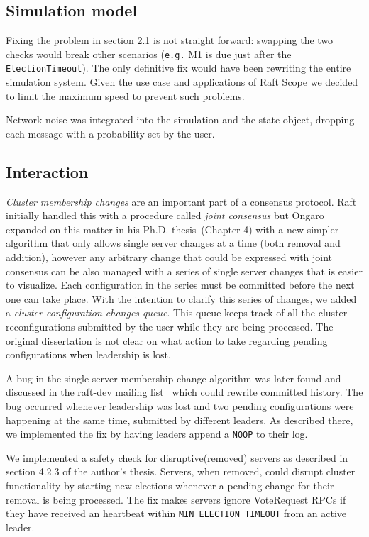\subsection{Simulation model}
Fixing the problem in section 2.1 is not straight forward: swapping the two checks would
break other scenarios (\texttt{e.g.} M1 is due just after the \texttt{ElectionTimeout}).
The only definitive fix would have been rewriting the entire simulation system.
Given the use case and applications of Raft Scope we decided to limit the maximum speed to prevent such problems.

Network noise was integrated into the simulation and the state object, dropping each message with a probability
set by the user.

\subsection{Interaction}
\emph{Cluster membership changes} are an important part of a consensus protocol. Raft initially handled this with a procedure
called \emph{joint consensus} but Ongaro expanded on this matter in his Ph.D. thesis~\cite{ongaro2014consensus}(Chapter 4) with a new
simpler algorithm that only allows single server changes at a time (both removal and addition), however any arbitrary
change that could be expressed with joint consensus can be also managed with a series of single server changes that is easier to visualize.
Each configuration in the series must be committed before the next one can take place.
With the intention to clarify this series of changes, we added a \emph{cluster configuration changes queue}.
This queue keeps track of all the cluster reconfigurations submitted by the user while they are being processed.
The original dissertation is not clear on what action to take regarding pending configurations when leadership is lost.

A bug in the single server membership change algorithm was later found and discussed in the raft-dev mailing list~\cite{bug} which
could rewrite committed history. The bug occurred whenever leadership was lost and two pending configurations were happening
at the same time, submitted by different leaders. As described there, we implemented the fix by having leaders append a \texttt{NOOP} to their log.

We implemented a safety check for disruptive(removed) servers as described in section 4.2.3 of the author's thesis.
Servers, when removed, could disrupt cluster functionality by starting new elections whenever a pending change for their removal
is being processed. The fix makes servers ignore VoteRequest RPCs if they have received an heartbeat within
\texttt{MIN\_ELECTION\_TIMEOUT} from an active leader.

